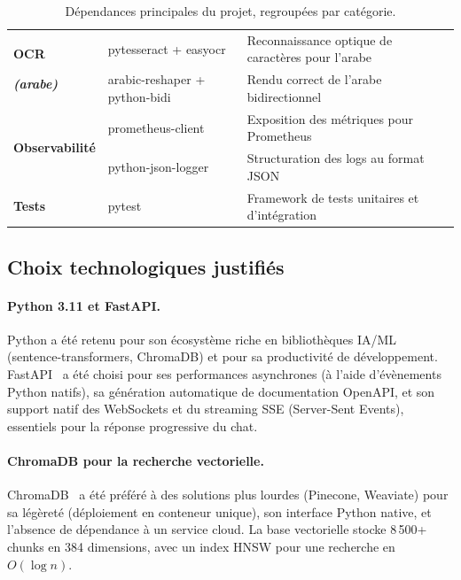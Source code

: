 \documentclass[12pt,a4paper,oneside]{report}
\begin{document}
\begin{table}[htbp]
\begin{tabular}{@{}p{3.2cm}p{3.5cm}p{5.5cm}@{}}
\midrule
\multirow{2}{3.2cm}{\textbf{OCR}\par\textbf{\textit{(arabe)}}} & pytesseract + easyocr & Reconnaissance optique de caract\`{e}res pour l'arabe \\
 & arabic-reshaper + python-bidi & Rendu correct de l'arabe bidirectionnel \\
\midrule
\multirow{2}{3.2cm}{\textbf{Observabilit\'{e}}} & prometheus-client & Exposition des m\'{e}triques pour Prometheus \\
 & python-json-logger & Structuration des logs au format JSON \\
\midrule
\textbf{Tests} & pytest & Framework de tests unitaires et d'int\'{e}gration \\
\bottomrule
\end{tabular}
\caption{D\'{e}pendances principales du projet, regroup\'{e}es par cat\'{e}gorie.}\label{tab:dependencies}
\end{table}


\subsection{Choix technologiques justifi\'{e}s}

\paragraph{Python 3.11 et FastAPI.} Python a \'{e}t\'{e} retenu pour son \'{e}cosyst\`{e}me riche en biblioth\`{e}ques IA/ML (sentence-transformers, ChromaDB) et pour sa productivit\'{e} de d\'{e}veloppement. FastAPI~\cite{fastapi} a \'{e}t\'{e} choisi pour ses performances asynchrones (\`{a} l'aide d'\'{e}v\`{e}nements Python natifs), sa g\'{e}n\'{e}ration automatique de documentation OpenAPI, et son support natif des WebSockets et du streaming SSE (Server-Sent Events), essentiels pour la r\'{e}ponse progressive du chat.

\paragraph{ChromaDB pour la recherche vectorielle.} ChromaDB~\cite{chromadb} a \'{e}t\'{e} pr\'{e}f\'{e}r\'{e} \`{a} des solutions plus lourdes (Pinecone, Weaviate) pour sa l\'{e}g\`{e}ret\'{e} (d\'{e}ploiement en conteneur unique), son interface Python native, et l'absence de d\'{e}pendance \`{a} un service cloud. La base vectorielle stocke 8\,500+ chunks en 384 dimensions, avec un index HNSW pour une recherche en $O(\log n)$.
\end{document}
